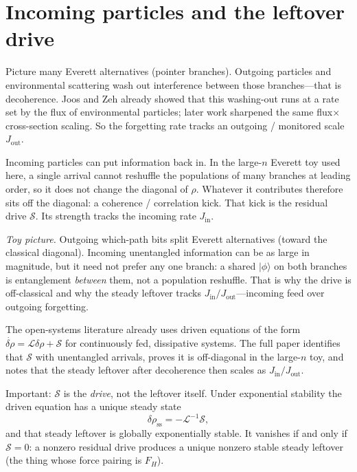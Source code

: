 \documentclass[11pt]{article}
\theoremstyle{remark}
\begin{document}
\section{Incoming particles and the leftover drive}
\label{sec:synopsis-incoming}
Picture many Everett alternatives (pointer branches).
Outgoing particles and environmental scattering wash out interference between those branches---that is decoherence.
Joos and Zeh already showed that this washing-out runs at a rate set by the flux of environmental particles; later work sharpened the same flux$\times$cross-section scaling.
So the forgetting rate tracks an outgoing / monitored scale $J_{\mathrm{out}}$.

Incoming particles can put information back in.
In the large-$n$ Everett toy used here, a single arrival cannot reshuffle the populations of many branches at leading order, so it does not change the diagonal of $\rho$.
Whatever it contributes therefore sits off the diagonal: a coherence / correlation kick.
That kick is the residual drive $\mathcal S$.
Its strength tracks the incoming rate $J_{\mathrm{in}}$.

\noindent\textit{Toy picture.}
Outgoing which-path bits split Everett alternatives (toward the classical diagonal).
Incoming unentangled information can be as large in magnitude, but it need not prefer any one branch: a shared $\lvert\phi\rangle$ on both branches is entanglement \emph{between} them, not a population reshuffle.
That is why the drive is off-classical and why the steady leftover tracks $J_{\mathrm{in}}/J_{\mathrm{out}}$---incoming feed over outgoing forgetting.

The open-systems literature already uses driven equations of the form $\dot{\delta\rho}=\mathcal L\delta\rho+\mathcal S$ for continuously fed, dissipative systems.
The full paper identifies that $\mathcal S$ with unentangled arrivals, proves it is off-diagonal in the large-$n$ toy, and notes that the steady leftover after decoherence then scales as $J_{\mathrm{in}}/J_{\mathrm{out}}$.

Important: $\mathcal S$ is the \emph{drive}, not the leftover itself.
Under exponential stability the driven equation has a unique steady state
\begin{equation}
  \delta\rho_{\mathrm{ss}}=-\mathcal L^{-1}\mathcal S,
\end{equation}
and that steady leftover is globally exponentially stable.
It vanishes if and only if $\mathcal S=0$: a nonzero residual drive produces a unique nonzero stable steady leftover (the thing whose force pairing is $F_H$).
\end{document}
